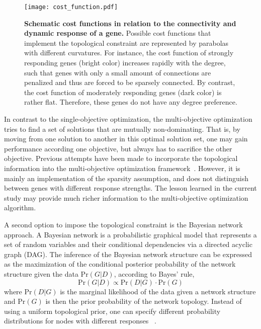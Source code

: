 \begin{figure}[!ht]
\begin{center}
\texttt{[image: cost\_function.pdf]}
\end{center}
\caption[Topological constraint in reverse-engineering]{
{\bf Schematic cost functions in relation to the connectivity and dynamic 
response of a gene.}
Possible cost functions that implement the topological constraint are
represented by parabolas with different curvatures. For instance, the 
cost function of strongly responding genes (bright color) increases
rapidly with the degree, such that genes with only a small amount of
connections are penalized and thus are forced to be sparsely connected.
By contrast, the cost function of moderately responding genes (dark color)
is rather flat. Therefore, these genes do not have any degree preference.
}
\label{fig:cost_function}
\end{figure}

In contrast to the single-objective optimization, the multi-objective
optimization tries to find a set of solutions that are mutually non-dominating.
That is, by moving from one solution to another in this optimal solution set,
one may gain performance according one objective, but always has to 
sacrifice the other objective.
Previous attempts have been made to incorporate the topological information
into the multi-objective optimization framework~\citep{Spieth2005}. However,
it is mainly an implementation of the sparsity assumption, and does not
distinguish between genes with different response strengths. The lesson
learned in the current study may provide much richer information to the 
multi-objective optimization algorithm.

A second option to impose the topological constraint is the Bayesian network
approach. A Bayesian network is a probabilistic graphical model that represents 
a set of random variables and their conditional dependencies via a directed 
acyclic graph (DAG). The inference of the Bayesian network structure can be 
expressed as the maximization of the conditional posterior probability of 
the network structure given the data $\mathrm{Pr}(G|D)$, according to Bayes' rule,
\begin{equation}
\mathrm{Pr}(G|D) \propto \mathrm{Pr}(D|G) \cdot \mathrm{Pr}(G)
\end{equation}
where $\mathrm{Pr}(D|G)$ is the marginal likelihood of the data given a network 
structure and $\mathrm{Pr}(G)$ is then the prior probability of the network 
topology. Instead of using a uniform topological prior, one can specify 
different probability distributions for nodes with different responses~%
\citep{Friedman1998,Huang2007}.

